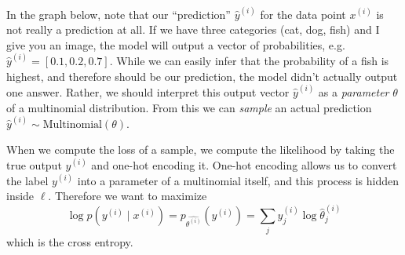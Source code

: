   \begin{example}[Softmax]
    \label{ex:softmax}
    In the graph below, note that our ``prediction'' $\hat{y}^{(i)}$ for the data point $x^{(i)}$ is not really a prediction at all. If we have three categories (cat, dog, fish) and I give you an image, the model will output a vector of probabilities, e.g. $\hat{y}^{(i)} = [0.1, 0.2, 0.7]$. While we can easily infer that the probability of a fish is highest, and therefore should be our prediction, the model didn't actually output one answer. Rather, we should interpret this output vector $\hat{y}^{(i)}$ as a \textit{parameter} $\theta$ of a multinomial distribution. From this we can \textit{sample} an actual prediction $\hat{y}^{(i)} \sim \mathrm{Multinomial}(\theta)$. 

    When we compute the loss of a sample, we compute the likelihood by taking the true output $y^{(i)}$ and one-hot encoding it. One-hot encoding allows us to convert the label $y^{(i)}$ into a parameter of a multinomial itself, and this process is hidden inside $\ell$. Therefore we want to maximize
    \begin{equation}
      \log p(y^{(i)} \mid x^{(i)}) = p_{\hat{\theta^{(i)}}} (y^{(i)}) = \sum_j y_j^{(i)} \log  \hat{\theta}^{(i)}_j 
    \end{equation}
    which is the cross entropy. 

    \begin{figure}[H]
      \centering
      \begin{tikzpicture}[x=0.75pt,y=0.75pt,yscale=-1,xscale=1]


\end{tikzpicture}
\end{figure}
\end{example}

